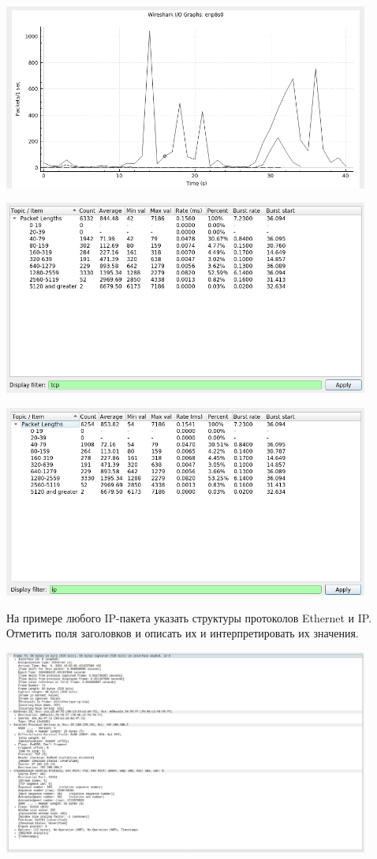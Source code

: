 \includegraphics[width=0.9\textwidth]{resources/averageSpeed}

\includegraphics[width=0.9\textwidth]{resources/tcpAverageSize}

\includegraphics[width=0.9\textwidth]{resources/ipAverageSize}

На примере любого IP-пакета указать структуры протоколов Ethernet и IP.
Отметить поля заголовков и описать их и интерпретировать их значения.

\includegraphics[width=0.9\textwidth]{resources/ipPackage}

